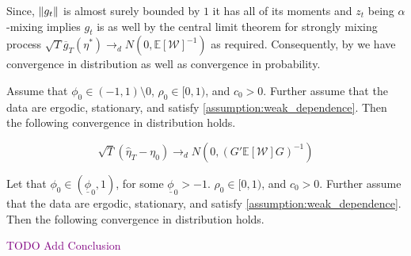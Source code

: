 \documentclass[11pt]{article}
\newcommand{\purple}[1]{\textcolor{purple}{#1}}
\newcommand*{\W}{\mathcal{W}}
\newcommand*{\E}{\mathbb{E}}
\newcommand*{\N}{N}
\newcommand*{\dto}{\ensuremath{\to_d}}
\newcommand*{\sampmom}{\ensuremath{\overline{g}_T}}
\DeclarePairedDelimiter\norm{\lVert}{\rVert}
\begin{document}
Since, $\norm*{g_t}$ is almost surely bounded by $1$ it has all of its moments and $z_t$ being $\alpha$-mixing
implies $g_t$ is as well by the central limit theorem for strongly mixing process 
$\sqrt{T} \sampmom(\eta^{*}) \dto \N\left(0, \E\left[\W\right]^{-1}\right)$ as required. 
Consequently, by \textcite[theorem 3.2]{newey1994large} we have convergence in distribution as well as convergence
in probability.

\begin{theorem}
    Assume that $\phi_0  \in (-1,1) \setminus 0$, $\rho_0 \in [0,1)$, and $c_0 > 0$. 
    Further assume that the data are ergodic, stationary, and satisfy \cref{assumption:weak_dependence}.
    Then the following convergence in distribution holds.

    \begin{equation}
    \sqrt{T} (\widehat{\eta}_T - \eta_0) \dto \N\left(0, \left(G' \E[\W] G\right)^{-1}\right)
    \end{equation}
\end{theorem}


\begin{theorem}
    Let that $\phi_0  \in (\underline{\phi}_0,1)$, for some $\underline{\phi}_0 > -1$. 
    $\rho_0 \in [0,1)$, and $c_0 > 0$. 
    Further assume that the data are ergodic, stationary, and satisfy \cref{assumption:weak_dependence}.
    Then the following convergence in distribution holds.

    \purple{TODO Add Conclusion}
\end{theorem}
\end{document}
